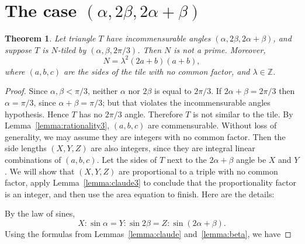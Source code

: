 \documentclass{amsart}
\theoremstyle{plain}
\newtheorem{theorem}{Theorem}
\theoremstyle{definition}
\theoremstyle{remark}
\def\Z{{\mathbb Z}}
\begin{document}
\section{The case $(\alpha,2\beta,2\alpha+\beta)$}


\begin{theorem} \label{theorem:case3}  Let triangle $T$ have incommensurable angles 
$(\alpha, 2\beta, 2\alpha + \beta)$, and suppose $T$ is $N$-tiled by $(\alpha,\beta,2\pi/3)$.
Then $N$ is not a prime.  Moreover,
$$ N = \lambda^2 (2a+b) (a+b),$$
where $(a,b,c)$ are the sides of the tile with no common factor, and $\lambda \in \Z$.
\end{theorem}

\begin{proof}  Since $\alpha, \beta < \pi/3$,  neither $\alpha$ nor $2\beta$ is equal to $2\pi/3$.
If $2\alpha + \beta = 2\pi/3$ then $\alpha = \pi/3$, since $\alpha + \beta = \pi/3$; but that
violates the incommensurable angles hypothesis.  Hence $T$ has no $2\pi/3$ angle. 
Therefore $T$ is not similar to the tile.
By Lemma~\ref{lemma:rationality3}, $(a,b,c)$ are commensurable.
Without loss of generality, we may assume they are integers with no common factor.
Then the side lengths $(X,Y,Z)$ are also integers, since they are integral linear
combinations of $(a,b,c)$. 
Let the sides of $T$ next to the $2\alpha + \beta$ angle be $X$ and $Y$.  
We will show that $(X,Y,Z)$  are proportional to a triple with
no common factor, apply Lemma~\ref{lemma:claude3} to conclude
that the proportionality factor is an integer, 
and then use the area equation to finish.   Here are the details:

By the law of sines,
$$ X: {\sin \alpha} =   Y :{\sin 2 \beta} = Z :{\sin( 2\alpha + \beta)}.$$
Using the formulas from Lemmas~\ref{lemma:claude} and~\ref{lemma:beta}, we have 


\end{proof}
\end{document}
